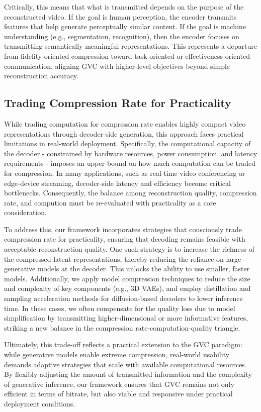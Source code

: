 \documentclass{fairmeta}
\begin{document}
Critically, this means that what is transmitted depends on the purpose of the reconstructed video. If the goal is human perception, the encoder transmits features that help generate perceptually similar content. If the goal is machine understanding (e.g., segmentation, recognition), then the encoder focuses on transmitting semantically meaningful representations. This represents a departure from fidelity-oriented compression toward task-oriented or effectiveness-oriented communication, aligning GVC with higher-level objectives beyond simple reconstruction accuracy.

\subsection{Trading Compression Rate for Practicality}
While trading computation for compression rate enables highly compact video representations through decoder-side generation, this approach faces practical limitations in real-world deployment. Specifically, the computational capacity of the decoder - constrained by hardware resources, power consumption, and latency requirements - imposes an upper bound on how much computation can be traded for compression. In many applications, such as real-time video conferencing or edge-device streaming, decoder-side latency and efficiency become critical bottlenecks. Consequently, the balance among reconstruction quality, compression rate, and compution must be re-evaluated with practicality as a core consideration.

To address this, our framework incorporates strategies that consciously trade compression rate for practicality, ensuring that decoding remains feasible with acceptable reconstruction quality. One such strategy is to increase the richness of the compressed latent representations, thereby reducing the reliance on large generative models at the decoder. This unlocks the ability to use smaller, faster models. Additionally, we apply model compression techniques to reduce the size and complexity of key components (e.g., 3D VAEs), and employ distillation and sampling acceleration methods for diffusion-based decoders to lower inference time. In these cases, we often compensate for the quality loss due to model simplification by transmitting higher-dimensional or more informative features, striking a new balance in the compression rate-computation-quality triangle.

Ultimately, this trade-off reflects a practical extension to the GVC paradigm: while generative models enable extreme compression, real-world usability demands adaptive strategies that scale with available computational resources. By flexibly adjusting the amount of transmitted information and the complexity of generative inference, our framework ensures that GVC remains not only efficient in terms of bitrate, but also viable and responsive under practical deployment conditions.
\end{document}
